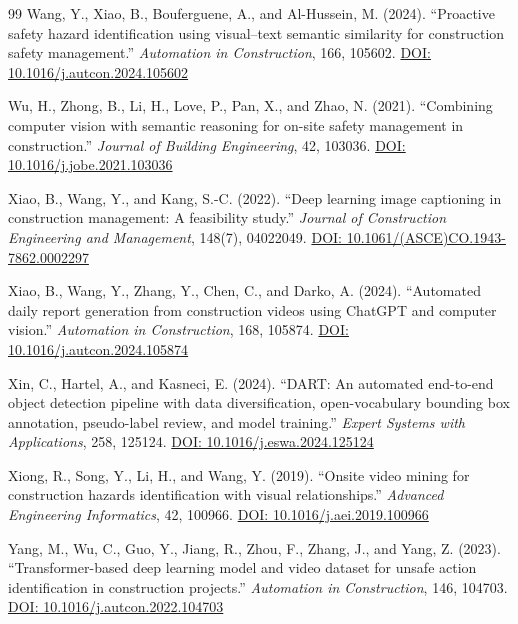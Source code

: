\documentclass[10pt,letterpaper]{article}
\begin{document}
\begin{thebibliography}{99}
 Wang, Y., Xiao, B., Bouferguene, A., and Al-Hussein, M. (2024). ``Proactive safety hazard identification using visual--text semantic similarity for construction safety management.'' \textit{Automation in Construction}, 166, 105602. \href{https://doi.org/10.1016/j.autcon.2024.105602}{DOI: 10.1016/j.autcon.2024.105602}

 Wu, H., Zhong, B., Li, H., Love, P., Pan, X., and Zhao, N. (2021). ``Combining computer vision with semantic reasoning for on-site safety management in construction.'' \textit{Journal of Building Engineering}, 42, 103036. \href{https://doi.org/10.1016/j.jobe.2021.103036}{DOI: 10.1016/j.jobe.2021.103036}

 Xiao, B., Wang, Y., and Kang, S.-C. (2022). ``Deep learning image captioning in construction management: A feasibility study.'' \textit{Journal of Construction Engineering and Management}, 148(7), 04022049. \href{https://doi.org/10.1061/(ASCE)CO.1943-7862.0002297}{DOI: 10.1061/(ASCE)CO.1943-7862.0002297}

 Xiao, B., Wang, Y., Zhang, Y., Chen, C., and Darko, A. (2024). ``Automated daily report generation from construction videos using ChatGPT and computer vision.'' \textit{Automation in Construction}, 168, 105874. \href{https://doi.org/10.1016/j.autcon.2024.105874}{DOI: 10.1016/j.autcon.2024.105874}

 Xin, C., Hartel, A., and Kasneci, E. (2024). ``DART: An automated end-to-end object detection pipeline with data diversification, open-vocabulary bounding box annotation, pseudo-label review, and model training.'' \textit{Expert Systems with Applications}, 258, 125124. \href{https://doi.org/10.1016/j.eswa.2024.125124}{DOI: 10.1016/j.eswa.2024.125124}

 Xiong, R., Song, Y., Li, H., and Wang, Y. (2019). ``Onsite video mining for construction hazards identification with visual relationships.'' \textit{Advanced Engineering Informatics}, 42, 100966. \href{https://doi.org/10.1016/j.aei.2019.100966}{DOI: 10.1016/j.aei.2019.100966}

 Yang, M., Wu, C., Guo, Y., Jiang, R., Zhou, F., Zhang, J., and Yang, Z. (2023). ``Transformer-based deep learning model and video dataset for unsafe action identification in construction projects.'' \textit{Automation in Construction}, 146, 104703. \href{https://doi.org/10.1016/j.autcon.2022.104703}{DOI: 10.1016/j.autcon.2022.104703}


\end{thebibliography}
\end{document}
